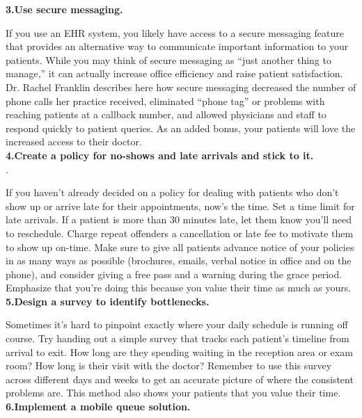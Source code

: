 \documentclass[12]{article}
\begin{document}
		 \textbf{3.Use secure messaging.\\}
		 
		 If you use an EHR system, you likely have access to a secure messaging feature that provides an alternative way to communicate important information to your patients. While you may think of secure messaging as “just another thing to manage,” it can actually increase office efficiency and raise patient satisfaction. Dr. Rachel Franklin describes here how secure messaging decreased the number of phone calls her practice received, eliminated “phone tag” or problems with reaching patients at a callback number, and allowed physicians and staff to respond quickly to patient queries. As an added bonus, your patients will love the increased access to their doctor.\\
		 
		 \textbf{4.Create a policy for no-shows and late arrivals and stick to it.\\}.
		 
		 If you haven’t already decided on a policy for dealing with patients who don’t show up or arrive late for their appointments, now’s the time. Set a time limit for late arrivals. If a patient is more than 30 minutes late, let them know you’ll need to reschedule. Charge repeat offenders a cancellation or late fee to motivate them to show up on-time. Make sure to give all patients advance notice of your policies in as many ways as possible (brochures, emails, verbal notice in office and on the phone), and consider giving a free pass and a warning during the grace period. Emphasize that you’re doing this because you value their time as much as yours.\\
		 
		 \textbf{5.Design a survey to identify bottlenecks.\\}
		 
		 Sometimes it’s hard to pinpoint exactly where your daily schedule is running off course. Try handing out a simple survey that tracks each patient’s timeline from arrival to exit. How long are they spending waiting in the reception area or exam room? How long is their visit with the doctor? Remember to use this survey across different days and weeks to get an accurate picture of where the consistent problems are. This method also shows your patients that you value their time.\\
		 
		 \textbf{6.Implement a mobile queue solution.\\}
		 
\end{document}
